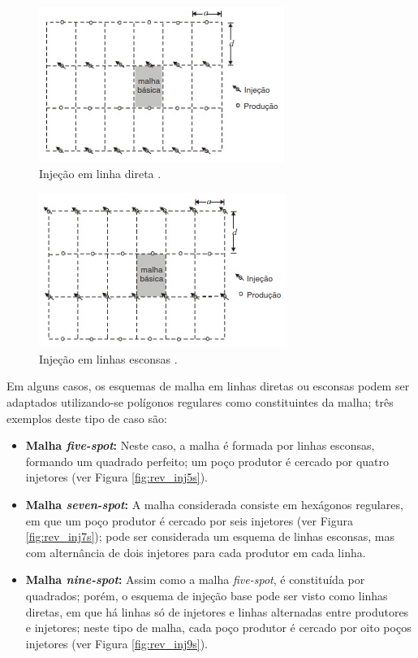 \begin{figure}[!ht]
\centering
\includegraphics[width=.6\textwidth]{figs/revisao/revisao_injld.png}
\caption{Inje\c{c}\~{a}o em linha direta \cite[p. 567]{engres}.}
\label{fig:rev_injld}
\end{figure}

\begin{figure}[!ht]
\centering
\includegraphics[width=.6\textwidth]{figs/revisao/revisao_injle.png}
\caption{Inje\c{c}\~{a}o em linhas esconsas \cite[p. 567]{engres}.}
\label{fig:rev_injle}
\end{figure}

Em alguns casos, os esquemas de malha em linhas diretas ou esconsas podem ser adaptados utilizando-se pol\'{i}gonos regulares como constituintes da malha; tr\^{e}s exemplos deste tipo de caso s\~{a}o:
\begin{itemize}
\item \textbf{Malha \textit{five-spot}:} Neste caso, a malha \'{e} formada por linhas esconsas, formando um quadrado perfeito; um po\c{c}o produtor \'{e} cercado por quatro injetores (ver Figura \ref{fig:rev_inj5s}).
\item \textbf{Malha \textit{seven-spot}:} A malha considerada consiste em hex\'{a}gonos regulares, em que um po\c{c}o produtor \'{e} cercado por seis injetores (ver Figura \ref{fig:rev_inj7s}); pode ser considerada um esquema de linhas esconsas, mas com altern\^{a}ncia de dois injetores para cada produtor em cada linha.
\item \textbf{Malha \textit{nine-spot}:} Assim como a malha \textit{five-spot}, \'{e} constitu\'{i}da por quadrados; por\'{e}m, o esquema de inje\c{c}\~{a}o base pode ser visto como linhas diretas, em que h\'{a} linhas s\'{o} de injetores e linhas alternadas entre produtores e injetores; neste tipo de malha, cada po\c{c}o produtor \'{e} cercado por oito po\c{c}os injetores (ver Figura \ref{fig:rev_inj9s}).
\end{itemize}

